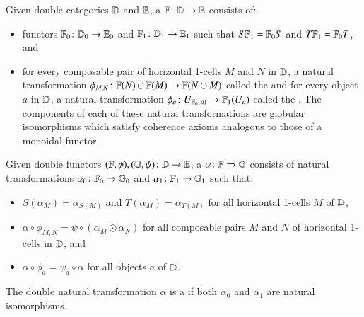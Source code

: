 \documentclass[reqno]{amsart}
\begin{document}
\begin{defn}\label{def:doublefun}
Given double categories $\mathbf{\mathbb D}$ and $\mathbf{\mathbb E}$, a  $\mathbf{\mathbb F} \colon \mathbf{\mathbb D} \to \mathbf{\mathbb E}$ consists of:
\begin{itemize}
\item{functors $\mathbf{\mathbb F}_0 \colon \mathbf{\mathbb D}_0 \to \mathbf{\mathbb E}_0$ and $\mathbf{\mathbb F}_1 \colon \mathbf{\mathbb D}_1 \to \mathbf{\mathbb E}_1$ such that $S \mathbf{\mathbb F}_1 = \mathbf{\mathbb F}_0 S$ and $T \mathbf{\mathbb F}_1 = \mathbf{\mathbb F}_0 T$, and}
\item{for every composable pair of horizontal 1-cells $M$ and $N$ in $\mathbf{\mathbb D}$, a natural transformation $\phi_{M,N} \colon \mathbf{\mathbb F}(N) \odot \mathbf{\mathbb F}(M) \to \mathbf{\mathbb F}(N \odot M)$ called the  and for every object $a$ in $\mathbf{\mathbb D}$, a natural transformation $\phi_a \colon U_{\mathbf{\mathbb F}_0(a)} \to \mathbf{\mathbb F}_1(U_a)$ called the . The components of each of these natural transformations are globular isomorphisms which satisfy coherence axioms analogous to those of a monoidal functor.}
\end{itemize}
\end{defn}

\begin{defn}
Given double functors $(\mathbf{\mathbb F},\phi),(\mathbb{G},\psi) \colon \mathbf{\mathbb D} \to \mathbf{\mathbb E}$, a  $\alpha \colon \mathbf{\mathbb F} \Rightarrow \mathbb{G}$ consists of natural transformations $\alpha_0 \colon \mathbf{\mathbb F}_0 \Rightarrow \mathbb{G}_0$ and $\alpha_1 \colon \mathbf{\mathbb F}_1 \Rightarrow \mathbb{G}_1$ such that:
\begin{itemize}
\item{$S(\alpha_M) = \alpha_{S(M)}$ and $T(\alpha_M) = \alpha_{T(M)}$ for all horizontal 1-cells $M$ of $\mathbf{\mathbb D}$,}
\item{$\alpha \circ \phi_{M,N} = \psi \circ (\alpha_M \odot \alpha_N)$ for all composable pairs $M$ and $N$ of horizontal 1-cells in $\mathbf{\mathbb D}$, and}
\item{$\alpha \circ \phi_a = \psi_a \circ \alpha$ for all objects $a$ of $\mathbf{\mathbb D}$.}
\end{itemize} 
The double natural transformation $\alpha$ is a  if both $\alpha_0$ and $\alpha_1$ are natural isomorphisms.
\end{defn}


\end{document}
